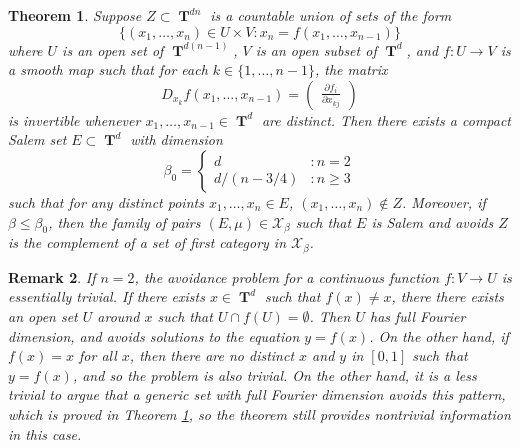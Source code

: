 \documentclass[dvipsnames,letterpaper,12pt]{article}
\numberwithin{equation}{section}
\DeclareMathOperator{\TT}{\mathbf{T}}
\newtheorem{theorem}{Theorem}
\newtheorem{remark}[theorem]{Remark}
\numberwithin{theorem}{section}
\begin{document}
\begin{theorem} \label{theoremJOICVIOJVI122}
    Suppose $Z \subset \TT^{dn}$ is a countable union of sets of the form
    \[ \{ (x_1,\dots,x_n) \in U \times V : x_n = f(x_1,\dots,x_{n-1}) \} \]
    where $U$ is an open set of $\TT^{d(n-1)}$, $V$ is an open subset of $\TT^d$, and $f: U \to V$ is a smooth map such that for each $k \in \{ 1, \dots, n-1 \}$, the matrix
    \[ D_{x_k} f(x_1,\dots,x_{n-1}) = \begin{pmatrix} \frac{\partial f_i}{\partial x_{kj}} \end{pmatrix} \]
    is invertible whenever $x_1,\dots,x_{n-1} \in \TT^d$ are distinct. Then there exists a compact Salem set $E \subset \TT^d$ with dimension
    \[ \beta_0 = \begin{cases} d &: n = 2 \\ d/(n - 3/4) &: n \geq 3 \end{cases} \]
    such that for any distinct points $x_1, \dots, x_n \in E$, $(x_1, \dots, x_n) \not \in Z$. Moreover, if $\beta \leq \beta_0$, then the family of pairs $(E,\mu) \in \mathcal{X}_\beta$ such that $E$ is Salem and avoids $Z$ is the complement of a set of first category in $\mathcal{X}_\beta$.
\end{theorem}

\begin{remark}
    If $n = 2$, the avoidance problem for a continuous function $f: V \to U$ is essentially trivial. If there exists $x \in \TT^d$ such that $f(x) \neq x$, there there exists an open set $U$ around $x$ such that $U \cap f(U) = \emptyset$. Then $U$ has full Fourier dimension, and avoids solutions to the equation $y = f(x)$. On the other hand, if $f(x) = x$ for all $x$, then there are no distinct $x$ and $y$ in $[0,1]$ such that $y = f(x)$, and so the problem is also trivial. On the other hand, it is a less trivial to argue that a \emph{generic} set with full Fourier dimension avoids this pattern, which is proved in Theorem \ref{theoremJOICVIOJVI122}, so the theorem still provides nontrivial information in this case.
\end{remark}
\end{document}
